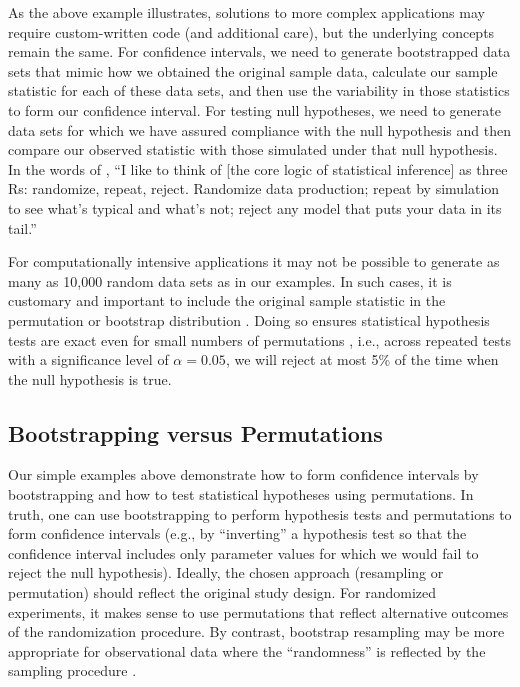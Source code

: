 \documentclass[fleqn,10pt]{wlpeerj} %
\begin{document}
As the above example illustrates, solutions to more complex applications may require custom-written code (and additional care), but the underlying concepts remain the same. For confidence intervals, we need to generate bootstrapped data sets that mimic how we obtained the original sample data, calculate our sample statistic for each of these data sets, and then use the variability in those statistics to form our confidence interval. For testing null hypotheses, we need to generate data sets for which we have assured compliance with the null hypothesis and then compare our observed statistic with those simulated under that null hypothesis. In the words of \citet{Cobb2007}, ``I like to think of {[}the core logic of statistical inference{]} as three Rs: randomize, repeat, reject. Randomize data production; repeat by simulation to see what's typical and what's not; reject any model that puts your data in its tail.''

For computationally intensive applications it may not be possible to generate as many as 10,000 random data sets as in our examples. In such cases, it is customary and important to include the original sample statistic in the permutation or bootstrap distribution \citep{davison_hinkley_1997, phipson2010permutation}. Doing so ensures statistical hypothesis tests are exact even for small numbers of permutations \citep{phipson2010permutation}, i.e., across repeated tests with a significance level of \(\alpha=0.05\), we will reject at most 5\% of the time when the null hypothesis is true.

\hypertarget{bootstrapping-versus-permutations}{%
\subsection*{Bootstrapping versus Permutations}\label{bootstrapping-versus-permutations}}

Our simple examples above demonstrate how to form confidence intervals by bootstrapping and how to test statistical hypotheses using permutations. In truth, one can use bootstrapping to perform hypothesis tests and permutations to form confidence intervals (e.g., by ``inverting'' a hypothesis test so that the confidence interval includes only parameter values for which we would fail to reject the null hypothesis). Ideally, the chosen approach (resampling or permutation) should reflect the original study design. For randomized experiments, it makes sense to use permutations that reflect alternative outcomes of the randomization procedure. By contrast, bootstrap resampling may be more appropriate for observational data where the ``randomness'' is reflected by the sampling procedure \citep[p.~274]{lock2013}.
\end{document}
